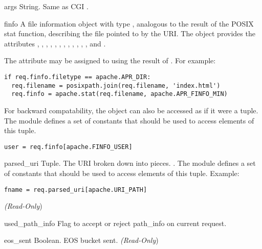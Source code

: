 \begin{memberdesc}[request]{args}
  String. Same as CGI .
\end{memberdesc}

\begin{memberdesc}[request]{finfo}
  A file information object with type , analogous to the
  result of the POSIX stat function, describing the
  file pointed to by the URI. The object provides the attributes
  , , , ,
  , , , , ,
  , , ,  and .

  The attribute may be assigned to using the result of .
  For example:

  \begin{verbatim}
if req.finfo.filetype == apache.APR_DIR:
  req.filename = posixpath.join(req.filename, 'index.html')
  req.finfo = apache.stat(req.filename, apache.APR_FINFO_MIN)
  \end{verbatim}

  For backward compatability, the object can also be accessed as if it
  were a tuple. The  module defines a set of 
  constants that should be used to access elements of this tuple.

  \begin{verbatim}
user = req.finfo[apache.FINFO_USER]
  \end{verbatim}
\end{memberdesc}

\begin{memberdesc}[request]{parsed_uri}
  Tuple. The URI broken down into pieces.
  . 
  The  module defines a set of  constants that
  should be used to access elements of this tuple. Example:
  \begin{verbatim}
fname = req.parsed_uri[apache.URI_PATH]
  \end{verbatim}
  \emph{(Read-Only})
\end{memberdesc}

\begin{memberdesc}[request]{used_path_info}
  Flag to accept or reject path_info on current request.
\end{memberdesc}

\begin{memberdesc}[request]{eos_sent}
  Boolean. EOS bucket sent.
  \emph{(Read-Only})
\end{memberdesc}


